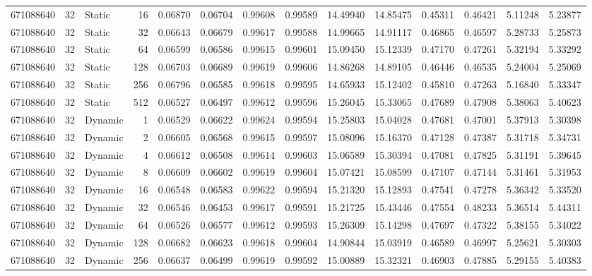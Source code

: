 \begin{tabular}{rrlrrrrrrrrrrr}
671088640 & 32 & Static & 16 & 0.06870 & 0.06704 & 0.99608 & 0.99589 & 14.49940 & 14.85475 & 0.45311 & 0.46421 & 5.11248 & 5.23877 \\
671088640 & 32 & Static & 32 & 0.06643 & 0.06679 & 0.99617 & 0.99588 & 14.99665 & 14.91117 & 0.46865 & 0.46597 & 5.28733 & 5.25873 \\
671088640 & 32 & Static & 64 & 0.06599 & 0.06586 & 0.99615 & 0.99601 & 15.09450 & 15.12339 & 0.47170 & 0.47261 & 5.32194 & 5.33292 \\
671088640 & 32 & Static & 128 & 0.06703 & 0.06689 & 0.99619 & 0.99606 & 14.86268 & 14.89105 & 0.46446 & 0.46535 & 5.24004 & 5.25069 \\
671088640 & 32 & Static & 256 & 0.06796 & 0.06585 & 0.99618 & 0.99595 & 14.65933 & 15.12402 & 0.45810 & 0.47263 & 5.16840 & 5.33347 \\
671088640 & 32 & Static & 512 & 0.06527 & 0.06497 & 0.99612 & 0.99596 & 15.26045 & 15.33065 & 0.47689 & 0.47908 & 5.38063 & 5.40623 \\
671088640 & 32 & Dynamic & 1 & 0.06529 & 0.06622 & 0.99624 & 0.99594 & 15.25803 & 15.04028 & 0.47681 & 0.47001 & 5.37913 & 5.30398 \\
671088640 & 32 & Dynamic & 2 & 0.06605 & 0.06568 & 0.99615 & 0.99597 & 15.08096 & 15.16370 & 0.47128 & 0.47387 & 5.31718 & 5.34731 \\
671088640 & 32 & Dynamic & 4 & 0.06612 & 0.06508 & 0.99614 & 0.99603 & 15.06589 & 15.30394 & 0.47081 & 0.47825 & 5.31191 & 5.39645 \\
671088640 & 32 & Dynamic & 8 & 0.06609 & 0.06602 & 0.99619 & 0.99604 & 15.07421 & 15.08599 & 0.47107 & 0.47144 & 5.31461 & 5.31953 \\
671088640 & 32 & Dynamic & 16 & 0.06548 & 0.06583 & 0.99622 & 0.99594 & 15.21320 & 15.12893 & 0.47541 & 0.47278 & 5.36342 & 5.33520 \\
671088640 & 32 & Dynamic & 32 & 0.06546 & 0.06453 & 0.99617 & 0.99591 & 15.21725 & 15.43446 & 0.47554 & 0.48233 & 5.36514 & 5.44311 \\
671088640 & 32 & Dynamic & 64 & 0.06526 & 0.06577 & 0.99612 & 0.99593 & 15.26309 & 15.14298 & 0.47697 & 0.47322 & 5.38155 & 5.34022 \\
671088640 & 32 & Dynamic & 128 & 0.06682 & 0.06623 & 0.99618 & 0.99604 & 14.90844 & 15.03919 & 0.46589 & 0.46997 & 5.25621 & 5.30303 \\
671088640 & 32 & Dynamic & 256 & 0.06637 & 0.06499 & 0.99619 & 0.99592 & 15.00889 & 15.32321 & 0.46903 & 0.47885 & 5.29155 & 5.40383 \\

\end{tabular}
